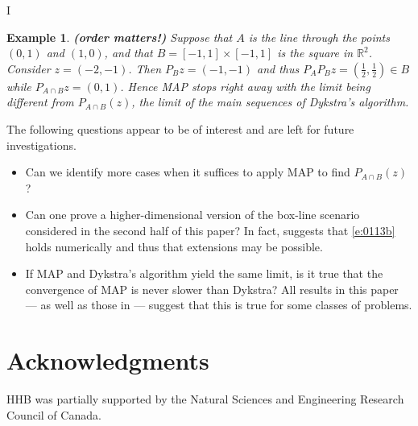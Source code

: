 I\documentclass[12pt]{article}
\newcommand{\thalb}{\ensuremath{\tfrac{1}{2}}}
\newcommand{\RR}{\ensuremath{\mathbb R}}
\newtheorem{example}[theorem]{Example}
\providecommand{\RR}{\mathbb{R}}
\providecommand{\RR}{\mathbb{R}}
\begin{document}
\begin{example} {\rm\bf (order matters!)}
Suppose 
that $A$ is the line through the points $(0,1)$ and $(1,0)$, and that 
$B = [-1,1]\times[-1,1]$ is the square in $\RR^2$. 
Consider $z=(-2,-1)$.
Then $P_Bz = (-1,-1)$ and thus $P_AP_Bz = (\thalb,\thalb)\in B$
while $P_{A\cap B}z = (0,1)$.
Hence MAP stops right away with the limit being
different from $P_{A\cap B}(z)$, the limit 
of the main sequences of Dykstra's algorithm. 
\end{example}

The following questions appear to be of interest and 
are left for future investigations. 
\begin{itemize}
  \item Can we identify more cases when it suffices to apply
   MAP to find $P_{A\cap B}(z)$?
  \item 
  Can one prove a higher-dimensional version of 
  the box-line scenario considered in the second half of this paper? 
  In fact, \cite{BBK} suggests that 
  \eqref{e:0113b} holds numerically and thus 
  that extensions may be possible. 
  \item If MAP and Dykstra's algorithm yield the same limit, is it true
  that the convergence of MAP is never slower than Dykstra?
  All results in this paper --- as well as those in \cite{Jat} --- suggest 
  that this is true for some classes of problems.
\end{itemize}



\section*{Acknowledgments}
HHB was partially supported by the Natural Sciences and
Engineering Research Council of Canada.
\end{document}
